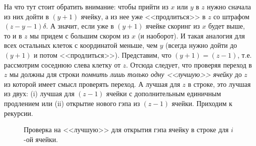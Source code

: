 \documentclass[letterpaper, 11pt]{article}
\begin{document}
На что тут стоит обратить внимание: чтобы прийти из $x$ или $y$ в $z$ нужно сначала из них дойти в $(y+1)$ ячейку, а из нее уже <<продлиться>> в $z$ со штрафом $(z - y - 1)\delta$. А значит, если уже в $(y + 1)$ ячейке скоринг из $x$ будет выше, то и в $z$ мы придем с большим скором из $x$ (и наоборот). И такая аналогия для всех остальных клеток с координатой меньше, чем $y$ (всегда нужно дойти до $(y+1)$ и потом <<продлиться>>). Представим, что $(y + 1) = (z - 1)$, т.е. рассмотрим соседнюю слева клетку от $z$. Отсюда следует, что проверяя переход в $z$ мы должны для строки \textit{помнить лишь только одну <<лучшую>> ячейку} до $z$ из которой имеет смысл проверять переход. А лучшая для $z$ в строке, это лучшая из двух: (i) лучшая для $(z - 1)$ ячейки с дополнительным единичным продлением или (ii) открытие нового гэпа из $(z-1)$ ячейки. Приходим к рекурсии.

\begin{figure}[H]
  \caption{Проверка на <<лучшую>> для открытия гэпа ячейку в строке для $i$-ой ячейки.}
\end{figure}
\end{document}
